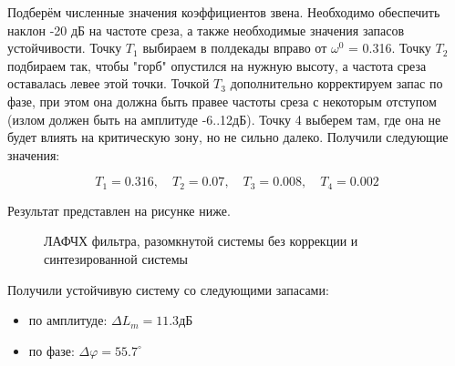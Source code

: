 \documentclass[main.tex]{subfiles}
\begin{document}
 
 Подберём численные значения коэффициентов звена. Необходимо обеспечить наклон -20 дБ 
 на частоте среза, а также необходимые значения запасов устойчивости. 
 Точку \( T_1 \) выбираем в полдекады вправо от \( \omega^0 \) = 0.316. Точку 
 \( T_2 \) подбираем так, чтобы "горб" опустился на нужную высоту,
 а частота среза оставалась левее этой точки.  Точкой \( T_3 \) дополнительно 
 корректируем запас по фазе, при этом она должна быть правее частоты среза
 с некоторым отступом (излом должен быть на амплитуде -6..12дБ). Точку 4 выберем
 там, где она не будет влиять на критическую зону, но не сильно далеко. Получили
 следующие значения:


\[ T_1 = 0.316,\quad T_2 = 0.07, \quad T_3 = 0.008, \quad T_4 = 0.002 \]

 Результат представлен на рисунке ниже.
 \begin{figure}[h]
     \caption{ЛАФЧХ фильтра, разомкнутой системы без коррекции и синтезированной
     системы}
 \end{figure}

 Получили устойчивую систему со следующими запасами:
\begin{itemize}
    \item по амплитуде: \( \Delta L_m = 11.3 \text{дБ} \)
    \item по фазе: \( \Delta \varphi = 55.7^\circ \)
\end{itemize}
\end{document}
